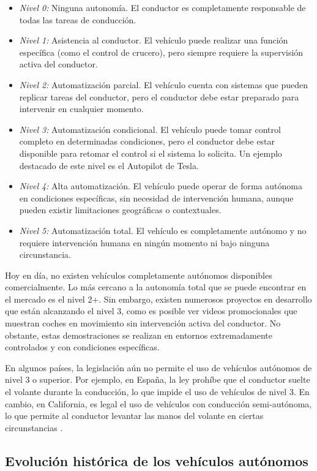 \begin{itemize}
    \item \textit{Nivel 0:} Ninguna autonomía. El conductor es completamente responsable de todas las tareas de conducción.
    \item \textit{Nivel 1:} Asistencia al conductor. El vehículo puede realizar una función específica (como el control de crucero), pero siempre requiere la supervisión activa del conductor.
    \item \textit{Nivel 2:} Automatización parcial. El vehículo cuenta con sistemas que pueden replicar tareas del conductor, pero el conductor debe estar preparado para intervenir en cualquier momento.
    \item \textit{Nivel 3:} Automatización condicional. El vehículo puede tomar control completo en determinadas condiciones, pero el conductor debe estar disponible para retomar el control si el sistema lo solicita. Un ejemplo destacado de este nivel es el Autopilot de Tesla.
    \item \textit{Nivel 4:} Alta automatización. El vehículo puede operar de forma autónoma en condiciones específicas, sin necesidad de intervención humana, aunque pueden existir limitaciones geográficas o contextuales.
    \item \textit{Nivel 5:} Automatización total. El vehículo es completamente autónomo y no requiere intervención humana en ningún momento ni bajo ninguna circunstancia.
\end{itemize}

Hoy en día, no existen vehículos completamente autónomos disponibles comercialmente. Lo más cercano a la autonomía total que se puede encontrar en el mercado es el nivel 2+. Sin embargo, existen numerosos proyectos en desarrollo que están alcanzando el nivel 3, como es posible ver videos promocionales que muestran coches en movimiento sin intervención activa del conductor. No obstante, estas demostraciones se realizan en entornos extremadamente controlados y con condiciones específicas.

En algunos países, la legislación aún no permite el uso de vehículos autónomos de nivel 3 o superior. Por ejemplo, en España, la ley prohíbe que el conductor suelte el volante durante la conducción, lo que impide el uso de vehículos de nivel 3. En cambio, en California, es legal el uso de vehículos con conducción semi-autónoma, lo que permite al conductor levantar las manos del volante en ciertas circunstancias \cite{carwow-autonomous}.

\subsection{Evolución histórica de los vehículos autónomos}
\label{sec:historia}

